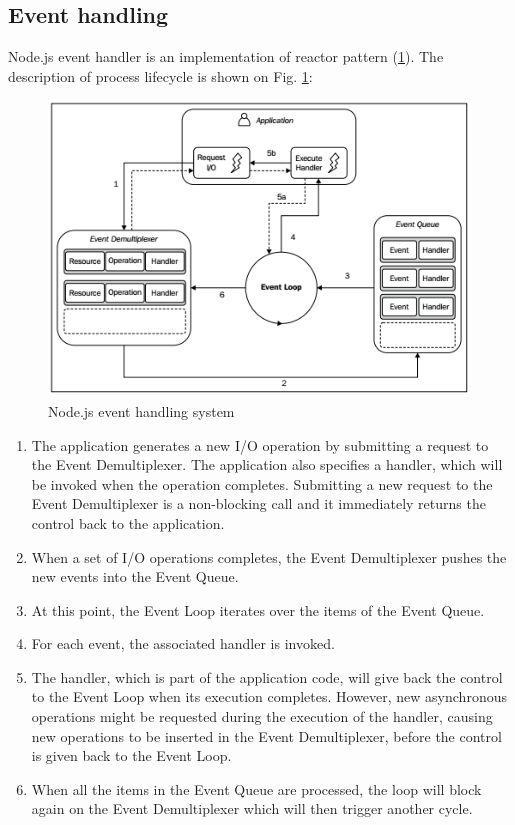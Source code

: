 \subsection{Event handling}
Node.js  event handler is an implementation of reactor pattern (\ref{fig:nodeEvent}). The description of process lifecycle is shown on Fig. \ref{fig:nodeEvent}:

\begin{figure}[ht]
  	\label{fig:nodeEvent}
    \centering
    \includegraphics[width=\textwidth]{grafiken/nodeEventHandling.png}
     \caption{Node.js event handling system \cite{nodejsbook}}
  \end{figure}

\begin{enumerate}
\item The application generates a new I/O operation by submitting a request to the Event Demultiplexer. The application also specifies a handler, which will be invoked when the operation completes. Submitting a new request to the Event Demultiplexer is a non-blocking call and it immediately returns the control back to the application.
\item When a set of I/O operations completes, the Event Demultiplexer pushes the new events into the Event Queue.
\item At this point, the Event Loop iterates over the items of the Event Queue.
\item For each event, the associated handler is invoked.
\item The handler, which is part of the application code, will give back the control to the Event Loop when its execution completes. However, new asynchronous operations might be requested during the execution of the handler, causing new operations to be inserted in the Event Demultiplexer, before the control is given back to the Event Loop.
\item When all the items in the Event Queue are processed, the loop will block again on the Event Demultiplexer which will then trigger another cycle.
\end{enumerate}

